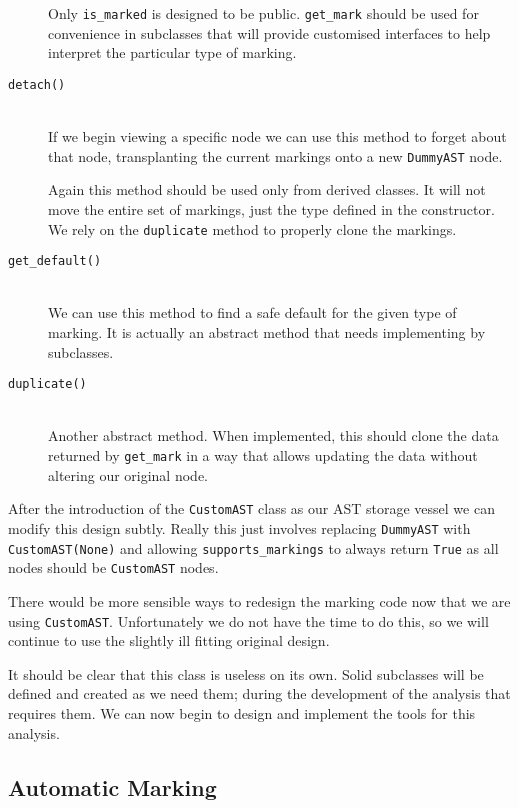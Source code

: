 \documentclass[twoside,a4paper]{report}
\begin{document}
\begin{description}
Only \texttt{is\_marked} is designed to be public. \texttt{get\_mark} should be used for convenience in subclasses that will provide
customised interfaces to help interpret the particular type of marking.

\item[\texttt{detach()}] \hfill \\
If we begin viewing a specific node we can use this method to forget about that node, transplanting the current markings onto a new
\texttt{DummyAST} node.

Again this method should be used only from derived classes. It will not move the entire set of markings, just the type defined
in the constructor. We rely on the \texttt{duplicate} method to properly clone the markings.

\item[\texttt{get\_default()}] \hfill \\
We can use this method to find a safe default for the given type of marking. It is actually an abstract method that needs implementing by
subclasses.

\item[\texttt{duplicate()}] \hfill \\
Another abstract method. When implemented, this should clone the data returned by \texttt{get\_mark} in a way that allows updating the
data without altering our original node.

\end{description}

After the introduction of the \texttt{CustomAST} class as our AST storage vessel we can modify this design subtly. Really this just
involves replacing \texttt{DummyAST} with \texttt{CustomAST(None)} and allowing \texttt{supports\_markings} to always return
\texttt{True} as all nodes should be \texttt{CustomAST} nodes.

There would be more sensible ways to redesign the marking code now that we are using \texttt{CustomAST}. Unfortunately we do not have the
time to do this, so we will continue to use the slightly ill fitting original design.

It should be clear that this class is useless on its own. Solid subclasses will be defined and created as we need them; during the
development of the analysis that requires them. We can now begin to design and implement the tools for this analysis.

\subsection{Automatic Marking}
\end{document}
